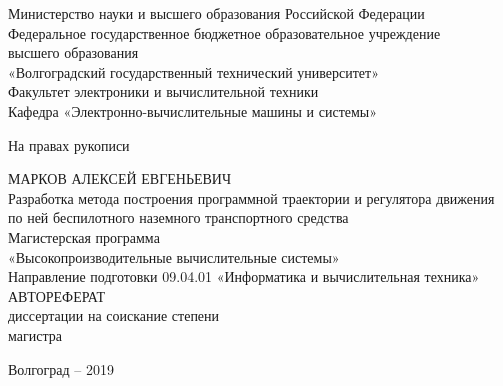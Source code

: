


\thispagestyle{empty}

\begin{nospasing}
\begin{center}
    Министерство науки и высшего образования Российской Федерации \\
    Федеральное государственное бюджетное образовательное учреждение \\
    высшего образования \\
    «Волгоградский государственный технический университет» \\
    Факультет электроники и вычислительной техники \\
    Кафедра «Электронно-вычислительные машины и системы» \\

    \begin{flushright}
    На правах рукописи \\
    \end{flushright}

    МАРКОВ АЛЕКСЕЙ ЕВГЕНЬЕВИЧ \\
    \vspace{1cm}
    Разработка метода построения программной траектории и регулятора движения по ней беспилотного
    наземного транспортного средства \\
    \vspace{1cm}
    Магистерская программа \\
    «Высокопроизводительные вычислительные системы» \\
    Направление подготовки 09.04.01 «Информатика и вычислительная техника» \\
    \vspace{1cm}
    АВТОРЕФЕРАТ \\
    \vspace{1cm}
    диссертации на соискание степени \\
    магистра \\

    \vfill

    Волгоград – 2019
\end{center}
\end{nospasing}

\newpage


